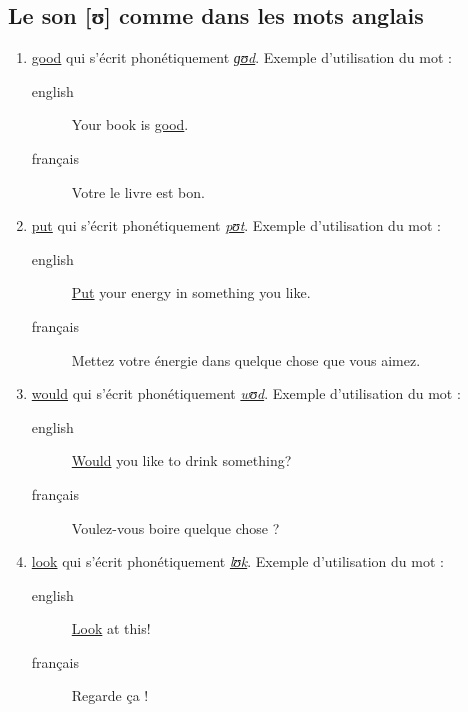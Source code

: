 \subsection{Le son [ʊ] comme dans les mots anglais}
\label{sec:org2ccc235}
\begin{enumerate}
\item \href{http://www.wordreference.com/enfr/good}{good} qui s'écrit phonétiquement \href{https://en.oxforddictionaries.com/definition/good}{\emph{ɡʊd}}. Exemple d'utilisation du mot :
\begin{description}
\item[{english}] \textenglish{Your book is \href{https://youtu.be/o3TQSaqHBtM}{good}.}
\item[{français}] Votre le livre est bon.
\end{description}
\item \href{http://www.wordreference.com/enfr/put}{put} qui s'écrit phonétiquement \href{https://en.oxforddictionaries.com/definition/put}{\emph{pʊt}}. Exemple d'utilisation du mot :
\begin{description}
\item[{english}] \textenglish{\href{https://youtu.be/BSpoa7TsiD0}{Put} your energy in something you like.}
\item[{français}] Mettez votre énergie dans quelque chose que vous
aimez.
\end{description}
\item \href{http://www.wordreference.com/enfr/would}{would} qui s'écrit phonétiquement \href{https://en.oxforddictionaries.com/definition/would}{\emph{wʊd}}. Exemple d'utilisation du mot :
\begin{description}
\item[{english}] \textenglish{\href{https://youtu.be/wRSNm3pr100}{Would} you like to drink something?}
\item[{français}] Voulez-vous boire quelque chose ?
\end{description}
\item \href{http://www.wordreference.com/enfr/look}{look} qui s'écrit phonétiquement \href{https://en.oxforddictionaries.com/definition/look}{\emph{lʊk}}. Exemple d'utilisation du mot :
\begin{description}
\item[{english}] \textenglish{\href{https://youtu.be/b4xcpMCPhfE}{Look} at this!}
\item[{français}] Regarde ça !
\end{description}
\end{enumerate}
